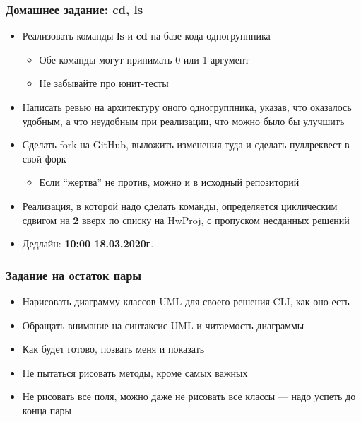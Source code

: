 \documentclass[xetex,mathserif,serif]{beamer}
\begin{document}
	\begin{frame}
		\frametitle{Домашнее задание: cd, ls}
		\begin{itemize}
			\item Реализовать команды \textbf{ls} и \textbf{cd} на базе кода одногруппника
			\begin{itemize}
				\item Обе команды могут принимать 0 или 1 аргумент
				\item Не забывайте про юнит-тесты
			\end{itemize}
			\item Написать ревью на архитектуру оного одногруппника, указав, что оказалось удобным, а что неудобным при реализации, что можно было бы улучшить
			\item Сделать fork на GitHub, выложить изменения туда и сделать пуллреквест в свой форк
			\begin{itemize}
				\item Если ``жертва'' не против, можно и в исходный репозиторий
			\end{itemize}
			\item Реализация, в которой надо сделать команды, определяется циклическим сдвигом на \textbf{2} вверх по списку на HwProj, с пропуском несданных решений
			\item Дедлайн: \textbf{10:00 18.03.2020г}.
		\end{itemize}
	\end{frame}

	\begin{frame}
		\frametitle{Задание на остаток пары}
		\begin{itemize}
			\item Нарисовать диаграмму классов UML для своего решения CLI, как оно есть
			\item Обращать внимание на синтаксис UML и читаемость диаграммы
			\item Как будет готово, позвать меня и показать
			\item Не пытаться рисовать методы, кроме самых важных
			\item Не рисовать все поля, можно даже не рисовать все классы --- надо успеть до конца пары
		\end{itemize}
	\end{frame}
\end{document}
